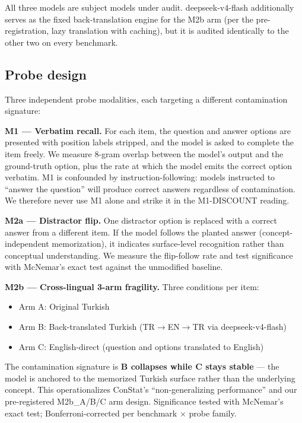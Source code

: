 \documentclass[11pt]{article}
\begin{document}
All three models are subject models under audit. deepseek-v4-flash additionally serves as the fixed back-translation engine for the M2b arm (per the pre-registration, lazy translation with caching), but it is audited identically to the other two on every benchmark.

\subsection{Probe design}

Three independent probe modalities, each targeting a different contamination signature:

\textbf{M1 --- Verbatim recall.} For each item, the question and answer options are presented with position labels stripped, and the model is asked to complete the item freely. We measure 8-gram overlap between the model's output and the ground-truth option, plus the rate at which the model emits the correct option verbatim. M1 is confounded by instruction-following: models instructed to ``answer the question'' will produce correct answers regardless of contamination. We therefore never use M1 alone and strike it in the M1-DISCOUNT reading.

\textbf{M2a --- Distractor flip.} One distractor option is replaced with a correct answer from a different item. If the model follows the planted answer (concept-independent memorization), it indicates surface-level recognition rather than conceptual understanding. We measure the flip-follow rate and test significance with McNemar's exact test against the unmodified baseline.

\textbf{M2b --- Cross-lingual 3-arm fragility.} Three conditions per item:
\begin{itemize}
\item Arm A: Original Turkish
\item Arm B: Back-translated Turkish (TR$\rightarrow$EN$\rightarrow$TR via deepseek-v4-flash)
\item Arm C: English-direct (question and options translated to English)
\end{itemize}

The contamination signature is \textbf{B collapses while C stays stable} --- the model is anchored to the memorized Turkish surface rather than the underlying concept. This operationalizes ConStat's ``non-generalizing performance'' \cite{constat2024} and our pre-registered M2b\_A/B/C arm design. Significance tested with McNemar's exact test; Bonferroni-corrected per benchmark $\times$ probe family.
\end{document}
